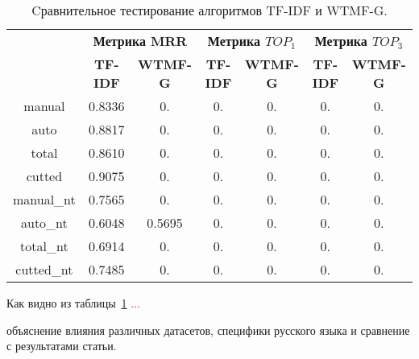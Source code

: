     \begin{table}[ht!]
    \caption{Cравнительное тестирование алгоритмов TF-IDF и WTMF-G. \bigskip}
    \centering

    \label{tabular:tfidf_wmtfg}
        \begin{tabular}{|c|c|c|c|c|c|c|}
            \hline
            \bf{\multirow{2}{*}{\specialcell{Набор данных}}} &
            \multicolumn{2}{|c|}{\bf{Метрика MRR}} &
            \multicolumn{2}{|c|}{\bf{Метрика $TOP_1$}} &
            \multicolumn{2}{|c|}{\bf{Метрика $TOP_3$}} \\ \cline{2-7}
            & \bf{TF-IDF} & \bf{WTMF-G} & \bf{TF-IDF} & \bf{WTMF-G} & \bf{TF-IDF} & \bf{WTMF-G} \\ \hline
            manual & 0.8336 & 0. & 0. & 0. & 0. & 0. \\ \hline
            auto & 0.8817 & 0. & 0. & 0. & 0. & 0. \\ \hline
            total & 0.8610 & 0. & 0. & 0. & 0. & 0. \\ \hline
            cutted & 0.9075 & 0. & 0. & 0. & 0. & 0. \\ \hline
            manual\_nt & 0.7565 & 0. & 0. & 0. & 0. & 0. \\ \hline
            auto\_nt & 0.6048 & 0.5695 & 0. & 0. & 0. & 0. \\ \hline
            total\_nt & 0.6914 & 0. & 0. & 0. & 0. & 0. \\ \hline
            cutted\_nt & 0.7485 & 0. & 0. & 0. & 0. & 0. \\ \hline
        \end{tabular}
    \end{table}
    Как видно из таблицы~\ref{tabular:tfidf_wmtfg} \textcolor{red}{...}

    объяснение влияния различных датасетов, специфики русского языка и сравнение с результатами статьи.
